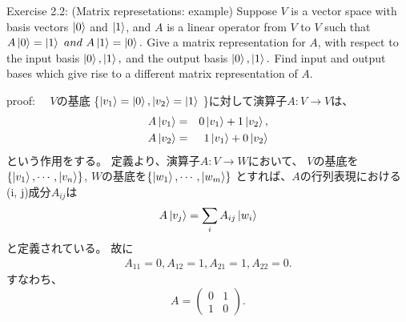 \begin{flushleft}
{\large Exercise 2.2: (Matrix represetations: example)}
 Suppose $V$ is a vector space with basis vectors $\ket{0}$ and $\ket{1}$,
and $A$ is a linear operator from $V$ to $V$ such that 
$A\ket{0} = \ket{1} ~and~ A\ket{1} = \ket{0}.$ 
Give a matrix representation for $A$, with respect to the input basis 
$\ket{0}, \ket{1},$ and the output basis $\ket{0}, \ket{1}.$ 
Find input and output bases which give rise to a different matrix representation of $A$.

\vspace{0.1in}
{\large proof:}
　$V$の基底
\{$
 \ket{v_1} = \ket{0}, \ket{v_2}=\ket{1} 
$
\}に対して演算子$A:V \to V $は、
\setcounter{equation}{0}
\begin{eqnarray*}
A\ket{v_1} &=& 0\ket{v_1} + 1\ket{v_2},\\
A\ket{v_2} &=& 1\ket{v_1} + 0\ket{v_2}
\end{eqnarray*}
という作用をする。
\newline
定義より、演算子$A:V \to W $において、
$V$の基底を$\{\ket{v_1},\cdots, \ket{v_n}\}$, 
\newline
$W$の基底を$\{\ket{w_1},\cdots, \ket{w_m}\}$
\newline
とすれば、$A$の行列表現における(i, j)成分$A_{ij}$は
\begin{eqnarray}
A\ket{v_j} = \sum_{i} A_{ij} \ket{w_i}
\end{eqnarray}
と定義されている。
 故に
\begin{eqnarray*}
A_{11}=0,
A_{12}=1,
A_{21}=1,
A_{22}=0.
\end{eqnarray*}
\newline
すなわち、
\[
A = \left(
	\begin{array}{cc}
	0 & 1\\
	1 & 0
	\end{array}
	\right).
\]

 \end{flushleft}

